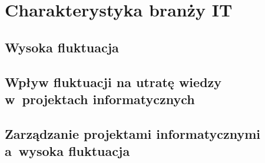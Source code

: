 \chapter{Charakterystyka branży IT}\label{ch:it-sector}
\section{Wysoka fluktuacja}\label{sec:it-turnover}

\section{Wpływ fluktuacji na utratę wiedzy w~projektach informatycznych}\label{sec:it-knowledge-loss}
\todo{}

\section{Zarządzanie projektami informatycznymi a~wysoka fluktuacja}\label{sec:it-project-management}

\thispagestyle{normal}
